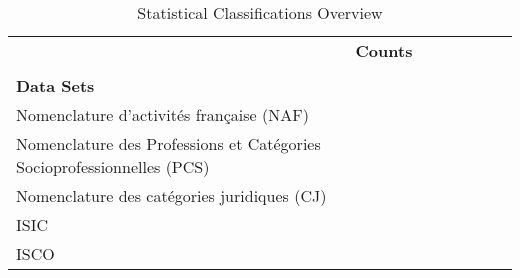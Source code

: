 \documentclass{llncs}
\newcommand*\rot{\rotatebox{90}}
\begin{document}
\begin{table}[H]
    \begin{center}
    \begin{tabular}{@{}lccccccccccc@{}}
           & \multicolumn{6}{c}{\textbf{Counts}}
    \\  \cmidrule{2-7}
    \\       \textbf{Data Sets}
           & \textbf{\rot{triples}}
           & \textbf{\rot{}}
           & \textbf{\rot{}}
           & \textbf{\rot{}}
           & \textbf{\rot{}}
					 & \textbf{\rot{}}
					 & \textbf{\rot{}}
    \\ \midrule
    Nomenclature d'activités française (NAF)\tablefootnote{\url{http://rdf.insee.fr/codes/index.html}} &  &  &  &  &  & \\
		Nomenclature des Professions et Catégories Socioprofessionnelles (PCS)\tablefootnote{\url{http://rdf.insee.fr/codes/index.html}} &  &  &  &  &  & \\
		Nomenclature des catégories juridiques (CJ)\tablefootnote{\url{http://rdf.insee.fr/codes/index.html}} &  &  &  &  &  & \\
		ISIC &  &  &  &  &  & \\
		ISCO &  &  &  &  &  & \\
    \bottomrule
    \end{tabular}
    \caption{Statistical Classifications Overview}
		\label{tab:statistical-classifications-overview}
    \end{center}
\end{table}


{}

\setcounter{tocdepth}{1}
\end{document}
